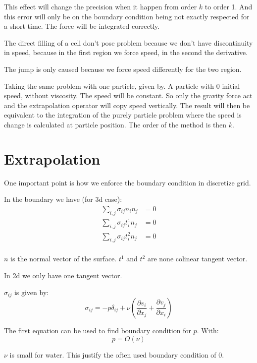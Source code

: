 This effect will change the precision when it happen from order $k$ to order 1.
And this error will only be on the boundary condition being not exactly respected for a short time.
The force will be integrated correctly.

The direct filling of a cell don't pose problem because we don't have discontinuity in speed, because in the first region we force speed,
in the second the derivative.

The jump is only caused because we force speed differently for the two region.


Taking the same problem with one particle, given by. A particle with 0 initial speed, without viscosity.
The speed will be constant. So only the gravity force act and the extrapolation operator will copy speed vertically.
The result will then be equivalent to the integration of the purely particle problem where the speed is change is calculated at particle position.
The order of the method is then $k$.

\section{Extrapolation}

One important point is how we enforce the boundary condition in discretize grid.

In the boundary we have (for 3d case):
\begin{align}
	\sum_{i,j}\sigma_{ij}n_{i}n_{j}&=0\\
	\sum_{i,j}\sigma_{ij}t^{1}_{i}n_{j}&=0\\
	\sum_{i,j}\sigma_{ij}t^{2}_{i}n_{j}&=0\\
\end{align}

$n$ is the normal vector of the surface.
$t^{1}$ and $t^{2}$ are none colinear tangent vector.

In 2d we only have one tangent vector.

$\sigma_{ij}$ is given by:
\begin{equation}
	\sigma_{ij}=-p \delta_{ij}+\nu\left(\frac{\partial v_{i}}{\partial x_{j}}+\frac{\partial v_{j}}{\partial x_{i}}\right)
\end{equation}

The first equation can be used to find boundary condition for $p$.
With:
\begin{equation}
	p=O(\nu)
\end{equation}

$\nu$ is small for water. This justify the often used boundary condition of 0.


